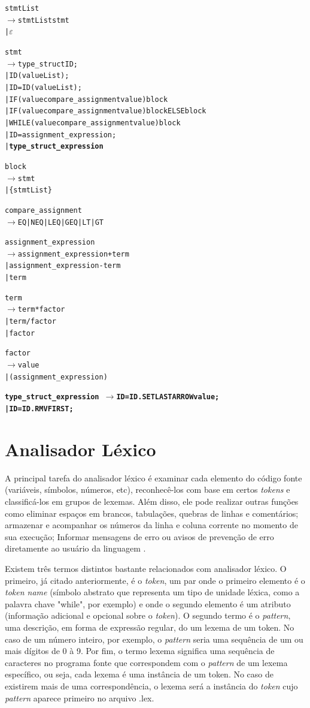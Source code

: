 \documentclass[12pt]{article}
\begin{document}
\begin{alltt}{\footnotesize

stmtList
   \(\to\) stmtList stmt
   | \(\varepsilon\)

stmt
   \(\to\) {\color{red}type\_struct ID ;}
    | ID ( {\color{red}valueList} ) ;
    | ID = ID ( {\color{red}valueList} ) ;
    | IF ( {\color{red}value compare\_assignment value} ) {\color{red}block}
    | IF ( {\color{red}value compare\_assignment value} ) {\color{red}block} ELSE {\color{red}block}
    | WHILE ( {\color{red}value compare\_assignment value} ) {\color{red}block}
    | ID = assignment\_expression ;
    | \textbf{type_struct_expression}
    
{\color{red}block
	 \(\to\) stmt
    | \{ stmtList \} }
    
compare\_assignment
   \(\to\) {\color{red}EQ | NEQ | LEQ | GEQ | LT | GT}

assignment\_expression
   \(\to\) assignment\_expression + term
    | assignment\_expression - term
    | term
    
term
   \(\to\) term * factor
    | term / factor
    | factor
    
factor
   \(\to\) {\color{red}value}
    | ( assignment\_expression )
    
\textbf{
type\_struct_expression\
   \(\to\) ID = ID {\color{red}. SETLAST ARROW value} ;
    | ID = ID {\color{red}. RMVFIRST} ;
}		
}\end{alltt}

\section{Analisador Léxico}

\indent A principal tarefa do analisador léxico é examinar cada elemento do código fonte (variáveis, símbolos, números, etc), reconhecê-los com base em certos \textit{tokens} e classificá-los em grupos de lexemas. Além disso, ele pode realizar outras funções como eliminar espaços em brancos, tabulações, quebras de linhas e comentários; armazenar e acompanhar os números da linha e  coluna corrente no momento de sua execução; Informar mensagens de erro ou avisos de prevenção de erro diretamente ao usuário da linguagem \cite{book}.

\indent Existem três termos distintos bastante relacionados com analisador léxico. O primeiro, já citado anteriormente, é o \textit{token}, um par onde o primeiro elemento é o \textit{token name} (símbolo abstrato que representa um tipo de unidade léxica, como a palavra chave "while", por exemplo) e onde o segundo elemento é um atributo (informação adicional e opcional sobre o \textit{token}). O segundo termo é o \textit{pattern}, uma descrição, em forma de expressão regular, do um lexema de um token. No caso de um número inteiro, por exemplo, o \textit{pattern} seria uma sequência de um ou mais dígitos de 0 à 9. Por fim, o termo lexema significa uma sequência de caracteres no programa fonte que correspondem com o \textit{pattern} de um lexema específico, ou seja, cada lexema é uma instância de um token. No caso de existirem mais de uma correspondência, o lexema será a instância do \textit{token} cujo \textit{pattern} aparece primeiro no arquivo .lex.
\end{document}
